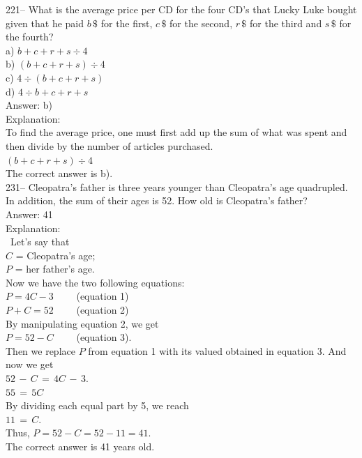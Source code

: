 \documentclass[letterpaper, 12pt]{article}
\begin{document}
221-- What is the average price per CD for the four CD's that Lucky Luke bought given that he paid $b\,\$$ for the first, $c\,\$$ for the second, $r\,\$$ for the third and $s\,\$$ for the fourth?\\
a) $b+c+r+s \div4$\\
b) $\left( b+c+r+s\right) \div 4$\\
c) $4\div \left( b+c+r+s\right) $\\
d) $4\div b+c+r+s$\\

Answer: b)\\

Explanation:\\
To find the average price, one must first add up the sum of what was spent and then divide by the number of articles purchased. \\
$\left( b+c+r+s\right) \div 4$\\
The correct answer is b).\\


231-- Cleopatra's father is three years younger than Cleopatra's age quadrupled. In addition, the sum of their ages is 52. How old is Cleopatra's father?\\

Answer: 41\\

Explanation: \\
\
Let's say that\\
$C$ = Cleopatra's age;\\
$P$ = her father's age.\\

Now we have the two following equations:\\
$P = 4C -3\qquad$ (equation 1)\\
$P + C = 52 \qquad$ (equation 2)\\

By manipulating equation 2, we get\\
$P = 52 - C\qquad$  (equation 3).\\
Then we replace $P$ from equation 1 with its valued obtained in equation 3.
And now we get\\
$52\,-\,C\,=\,4C\,-\,3$.\\
$55\,=\,5C$\\
By dividing each equal part by 5, we reach\\
$11\,=\,C$.\\

Thus, $P=52-C=52-11=41$.\\
The correct answer is 41 years old.\\
\end{document}
